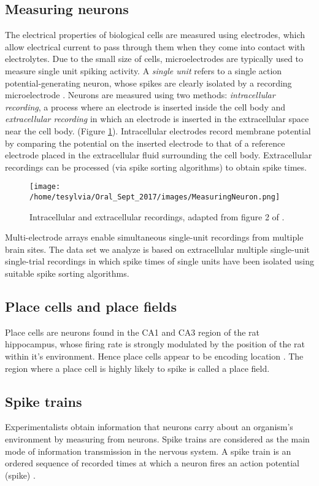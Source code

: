\subsection{Measuring neurons}
The electrical properties of biological cells are measured using electrodes, which allow electrical current to pass through them when they come into contact with electrolytes. Due to the small size of cells, microelectrodes are typically used to measure single unit spiking activity.
A \textit{single unit} refers to a single action potential-generating neuron, whose spikes are clearly isolated by a recording microelectrode \cite{Humphrey1990}.
Neurons are measured using two methods: \textit{intracellular recording}, a process where an electrode is inserted inside the cell body and \textit{extracellular recording} in which an electrode is inserted in the extracellular space near the cell body. (Figure \ref{fig:Electrodes}).
Intracellular electrodes record membrane potential by comparing the potential on the inserted electrode to that of a reference electrode placed in the extracellular fluid surrounding the cell body. Extracellular recordings can be 
processed (via spike sorting algorithms) to obtain spike times.

\begin{figure}[h]
\centering
\texttt{[image: /home/tesylvia/Oral\_Sept\_2017/images/MeasuringNeuron.png]}
\caption{Intracellular and  extracellular recordings, adapted from figure 2 of \cite{Humphrey1990}.}
      \label{fig:Electrodes}
\end{figure}

Multi-electrode arrays enable simultaneous single-unit recordings from multiple brain sites. The data set we analyze is based on extracellular multiple single-unit single-trial recordings in which spike times of single units have been isolated using suitable spike sorting algorithms.


\subsection{Place cells and place fields}
Place cells are neurons found in the CA1 and CA3 region of the rat hippocampus,
whose firing rate is strongly modulated by the position of the rat within it's
environment. Hence place cells appear to be encoding location \cite{OKeefe1971, OKeefe1978}. The region where a place cell is highly likely to spike is called a place field.

\subsection{Spike trains} 
Experimentalists obtain information that neurons carry about an organism's
environment by measuring from neurons. Spike trains are considered as the 
main mode of information transmission in the nervous system. 
A spike train is an ordered sequence of recorded times at which a neuron
fires an action potential (spike) \cite{Dayan2001}.


